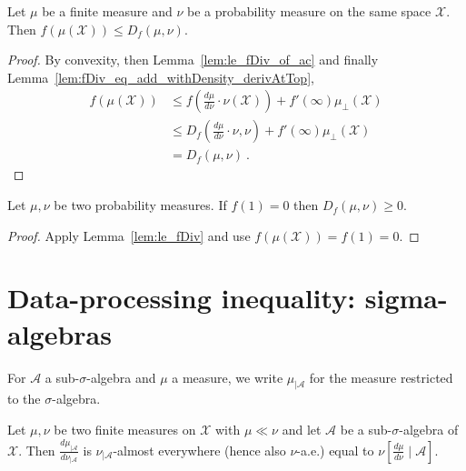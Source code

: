 \begin{lemma}
  \label{lem:le_fDiv}
  \leanok
  Let $\mu$ be a finite measure and $\nu$ be a probability measure on the same space $\mathcal X$. Then $f(\mu(\mathcal X)) \le D_f(\mu, \nu)$.
\end{lemma}

\begin{proof}\leanok
{}
By convexity, then Lemma~\ref{lem:le_fDiv_of_ac} and finally Lemma~\ref{lem:fDiv_eq_add_withDensity_derivAtTop},
\begin{align*}
f(\mu(\mathcal X))
&\le f(\frac{d\mu}{d\nu}\cdot \nu (\mathcal X)) + f'(\infty)\mu_{\perp}(\mathcal X)
\\
&\le D_f(\frac{d\mu}{d\nu}\cdot \nu , \nu) + f'(\infty)\mu_{\perp}(\mathcal X)
\\
&= D_f(\mu, \nu)
\: .
\end{align*}
\end{proof}

\begin{lemma}
  \label{lem:fDiv_nonneg}
  \leanok
  Let $\mu, \nu$ be two probability measures. If $f(1) = 0$ then $D_f(\mu, \nu) \ge 0$.
\end{lemma}

\begin{proof}\leanok
{}
Apply Lemma~\ref{lem:le_fDiv} and use $f(\mu(\mathcal X)) = f(1) = 0$.
\end{proof}

\section{Data-processing inequality: sigma-algebras}

For $\mathcal A$ a sub-$\sigma$-algebra and $\mu$ a measure, we write $\mathcal \mu_{| \mathcal A}$ for the measure restricted to the $\sigma$-algebra.

\begin{lemma}
  \label{lem:rnDeriv_trim_of_ac}
  \leanok
  Let $\mu, \nu$ be two finite measures on $\mathcal X$ with $\mu \ll \nu$ and let $\mathcal A$ be a sub-$\sigma$-algebra of $\mathcal X$.
  Then $\frac{d \mu_{| \mathcal A}}{d \nu_{| \mathcal A}}$ is $\nu_{| \mathcal A}$-almost everywhere (hence also $\nu$-a.e.) equal to $\nu\left[ \frac{d \mu}{d \nu} \mid \mathcal A\right]$.
\end{lemma}


